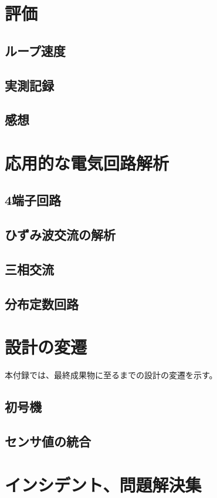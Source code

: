 \documentclass{ltjsreport}
\begin{document}
\chapter{評価}

\section{ループ速度}


\section{実測記録}


\section{感想}




\appendix

\chapter{応用的な電気回路解析}
\section{4端子回路}

\section{ひずみ波交流の解析}

\section{三相交流}

\section{分布定数回路}


\chapter{設計の変遷}
本付録では、最終成果物に至るまでの設計の変遷を示す。
\section{初号機}


\section{センサ値の統合}



\chapter{インシデント、問題解決集}
\end{document}
